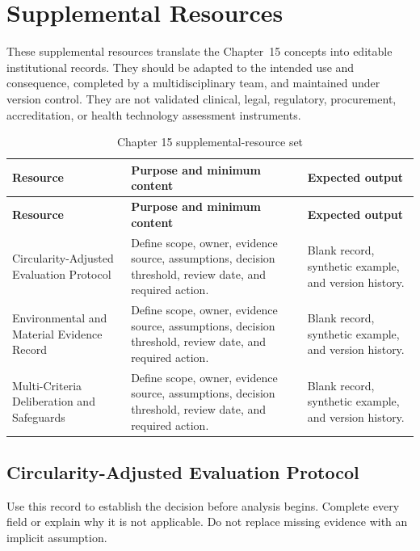 \section{Supplemental Resources}
\label{sec:comp-ch15-supplemental}

These supplemental resources translate the Chapter~15 concepts into editable
institutional records. They should be adapted to the intended use and consequence,
completed by a multidisciplinary team, and maintained under version control. They
are not validated clinical, legal, regulatory, procurement, accreditation, or health
technology assessment instruments.

\begin{longtable}{@{}p{}p{}p{}@{}}
\caption{Chapter 15 supplemental-resource set}
\label{tab:comp-ch15-supplemental-set}\\
\toprule
\textbf{Resource} & \textbf{Purpose and minimum content} & \textbf{Expected output} \\
\midrule
\endfirsthead
\toprule
\textbf{Resource} & \textbf{Purpose and minimum content} & \textbf{Expected output} \\
\midrule
\endhead
\bottomrule
\endlastfoot
Circularity-Adjusted Evaluation Protocol & Define scope, owner, evidence source, assumptions, decision threshold, review date, and required action. & Blank record, synthetic example, and version history. \\
Environmental and Material Evidence Record & Define scope, owner, evidence source, assumptions, decision threshold, review date, and required action. & Blank record, synthetic example, and version history. \\
Multi-Criteria Deliberation and Safeguards & Define scope, owner, evidence source, assumptions, decision threshold, review date, and required action. & Blank record, synthetic example, and version history. \\
\end{longtable}

\subsection{Circularity-Adjusted Evaluation Protocol}
\label{sec:comp-ch15-supp-1}
Use this record to establish the decision before analysis begins. Complete every
field or explain why it is not applicable. Do not replace missing evidence with an
implicit assumption.

